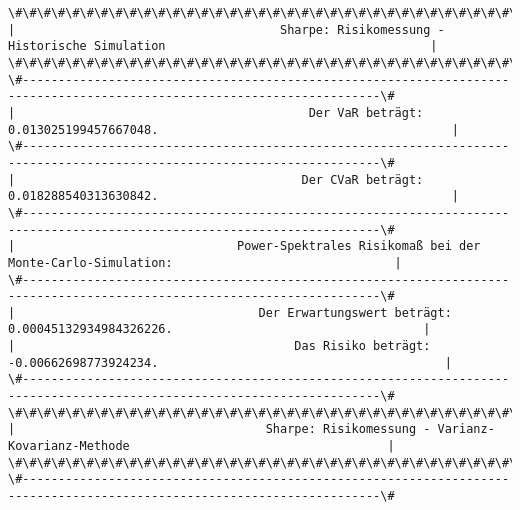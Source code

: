 \documentclass[paper=landscape]{scrartcl}
\begin{document}
    \begin{Verbatim}[commandchars=\\\{\}]
\#\#\#\#\#\#\#\#\#\#\#\#\#\#\#\#\#\#\#\#\#\#\#\#\#\#\#\#\#\#\#\#\#\#\#\#\#\#\#\#\#\#\#\#\#\#\#\#\#\#\#\#\#\#\#\#\#\#\#\#\#\#\#\#\#\#\#\#\#\#\#\#\#\#\#\#\#\#\#\#\#\#\#\#\#\#\#\#\#\#\#\#\#\#\#\#\#\#\#\#\#\#\#\#\#\#\#\#\#\#\#\#\#\#\#\#\#\#\#\#\#\#
|                                     Sharpe: Risikomessung - Historische Simulation                                     | 
\#\#\#\#\#\#\#\#\#\#\#\#\#\#\#\#\#\#\#\#\#\#\#\#\#\#\#\#\#\#\#\#\#\#\#\#\#\#\#\#\#\#\#\#\#\#\#\#\#\#\#\#\#\#\#\#\#\#\#\#\#\#\#\#\#\#\#\#\#\#\#\#\#\#\#\#\#\#\#\#\#\#\#\#\#\#\#\#\#\#\#\#\#\#\#\#\#\#\#\#\#\#\#\#\#\#\#\#\#\#\#\#\#\#\#\#\#\#\#\#\#\#
\#------------------------------------------------------------------------------------------------------------------------\#
|                                         Der VaR beträgt: 0.013025199457667048.                                         | 
\#------------------------------------------------------------------------------------------------------------------------\#
|                                        Der CVaR beträgt: 0.018288540313630842.                                         | 
\#------------------------------------------------------------------------------------------------------------------------\#
|                               Power-Spektrales Risikomaß bei der Monte-Carlo-Simulation:                               | 
\#------------------------------------------------------------------------------------------------------------------------\#
|                                  Der Erwartungswert beträgt: 0.00045132934984326226.                                   | 
|                                       Das Risiko beträgt: -0.00662698773924234.                                        | 
\#------------------------------------------------------------------------------------------------------------------------\#
\#\#\#\#\#\#\#\#\#\#\#\#\#\#\#\#\#\#\#\#\#\#\#\#\#\#\#\#\#\#\#\#\#\#\#\#\#\#\#\#\#\#\#\#\#\#\#\#\#\#\#\#\#\#\#\#\#\#\#\#\#\#\#\#\#\#\#\#\#\#\#\#\#\#\#\#\#\#\#\#\#\#\#\#\#\#\#\#\#\#\#\#\#\#\#\#\#\#\#\#\#\#\#\#\#\#\#\#\#\#\#\#\#\#\#\#\#\#\#\#\#\#
|                                   Sharpe: Risikomessung - Varianz-Kovarianz-Methode                                    | 
\#\#\#\#\#\#\#\#\#\#\#\#\#\#\#\#\#\#\#\#\#\#\#\#\#\#\#\#\#\#\#\#\#\#\#\#\#\#\#\#\#\#\#\#\#\#\#\#\#\#\#\#\#\#\#\#\#\#\#\#\#\#\#\#\#\#\#\#\#\#\#\#\#\#\#\#\#\#\#\#\#\#\#\#\#\#\#\#\#\#\#\#\#\#\#\#\#\#\#\#\#\#\#\#\#\#\#\#\#\#\#\#\#\#\#\#\#\#\#\#\#\#
\#------------------------------------------------------------------------------------------------------------------------\#

\end{Verbatim}
\end{document}
